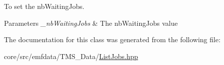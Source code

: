 To set the nbWaitingJobs. 


\begin{DoxyParams}{Parameters}
{\em \_\-nbWaitingJobs} & The nbWaitingJobs value \\
\hline
\end{DoxyParams}


The documentation for this class was generated from the following file:\begin{DoxyCompactItemize}
\item 
core/src/emfdata/TMS\_\-Data/\hyperlink{ListJobs_8hpp}{ListJobs.hpp}\end{DoxyCompactItemize}
